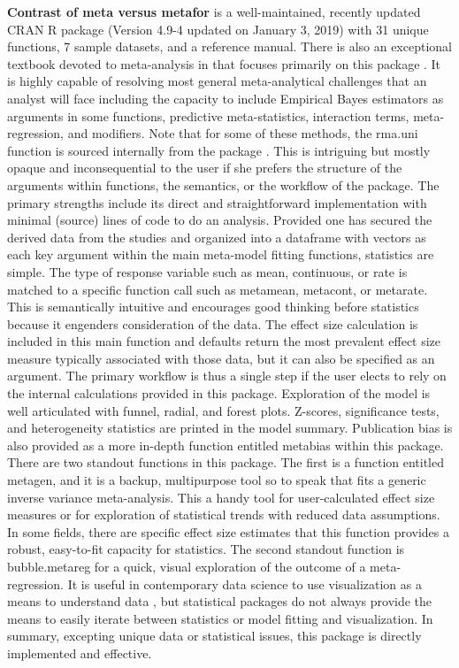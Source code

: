 \documentclass[softwarereview]{jss}
\begin{document}
\textbf{Contrast of meta versus metafor} \newline
{} is a well-maintained, recently updated CRAN R package (Version 4.9-4 updated on January 3, 2019) with 31 unique functions, 7 sample datasets, and a reference manual.  There is also an exceptional textbook devoted to meta-analysis in  that focuses primarily on this package \citep{RN6199}.  It is highly capable of resolving most general meta-analytical challenges that an analyst will face including the capacity to include Empirical Bayes estimators as arguments in some functions, predictive meta-statistics, interaction terms, meta-regression, and modifiers.  Note that for some of these methods, the rma.uni function is sourced internally from the package .  This is intriguing but mostly opaque and inconsequential to the user if she prefers the structure of the arguments within functions, the semantics, or the workflow of the   package.  The primary strengths include its direct and straightforward implementation with minimal (source) lines of code to do an analysis.  Provided one has secured the derived data from the studies and organized into a dataframe with vectors as each key argument within the main meta-model fitting functions, statistics are simple.  The type of response variable such as mean, continuous, or rate is matched to a specific function call such as metamean, metacont, or metarate.  This is semantically intuitive and encourages good thinking before statistics because it engenders consideration of the data.  The effect size calculation is included in this main function and defaults return the most prevalent effect size measure typically associated with those data, but it can also be specified as an argument.  The primary workflow is thus a single step if the user elects to rely on the internal calculations provided in this package.  Exploration of the model is well articulated with funnel, radial, and forest plots.  Z-scores, significance tests, and heterogeneity statistics are printed in the model summary. Publication bias is also provided as a more in-depth function entitled metabias within this package.  There are two standout functions in this package.  The first is a function entitled metagen, and it is a backup, multipurpose tool so to speak that fits a generic inverse variance meta-analysis.  This a handy tool for user-calculated effect size measures or for exploration of statistical trends with reduced data assumptions.  In some fields, there are specific effect size estimates that this function provides a robust, easy-to-fit capacity for statistics.  The second standout function is bubble.metareg for a quick, visual exploration of the outcome of a meta-regression.  It is useful in contemporary data science to use visualization as a means to understand data \citep{RN4510}, but statistical packages do not always provide the means to easily iterate between statistics or model fitting and visualization.  In summary, excepting unique data or statistical issues, this package is directly implemented and effective. \newline  
\end{document}
